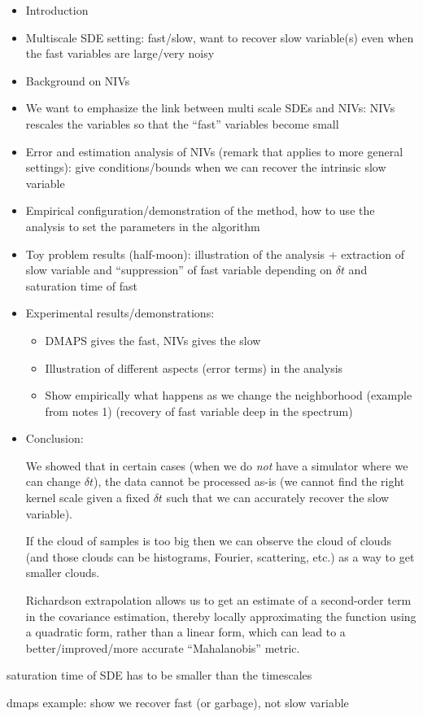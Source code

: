 \documentclass[12pt]{article}
\begin{document}
\begin{itemize}

\item Introduction

\item Multiscale SDE setting: fast/slow, want to recover slow variable(s) even when the fast variables are large/very noisy

\item Background on NIVs 	

\item We want to emphasize the link between multi scale SDEs and NIVs: NIVs rescales the variables so that the ``fast'' variables become small

\item Error and estimation analysis of NIVs (remark that applies to more general settings): give conditions/bounds when we can recover the intrinsic slow variable

\item Empirical configuration/demonstration of the method, how to use the analysis to set the parameters in the algorithm

\item Toy problem results (half-moon): illustration of the analysis + extraction of slow variable and ``suppression'' of fast variable depending on $\delta t$ and saturation time of fast

\item Experimental results/demonstrations:
\begin{itemize}

\item DMAPS gives the fast, NIVs gives the slow 

\item Illustration of different aspects (error terms) in the analysis

\item Show empirically what happens as we change the neighborhood (example from notes 1) (recovery of fast variable deep in the spectrum)

\end{itemize}

\item Conclusion: 

We showed that in certain cases (when we do {\em not} have a simulator where we can change $\delta t$), the data cannot be processed as-is (we cannot find the right kernel scale given a fixed $\delta t$ such that we can accurately recover the slow variable). 

If the cloud of samples is too big then we can observe the cloud of clouds (and those clouds can be histograms, Fourier, scattering, etc.) as a way to get smaller clouds. 


Richardson extrapolation allows us to get an estimate of a second-order term in the covariance estimation, thereby locally approximating the function using a quadratic form, rather than a linear form,  which can lead to a better/improved/more accurate ``Mahalanobis'' metric. 


\end{itemize}

saturation time of SDE has to be smaller than the timescales

dmaps example: show we recover fast (or garbage), not slow variable
\end{document}
